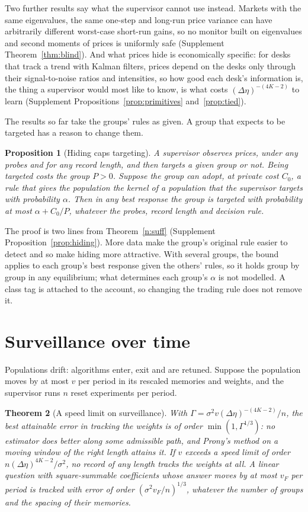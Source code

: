 \documentclass[12pt]{article}
\newtheorem{theorem}{Theorem}[section]
\newtheorem{proposition}[theorem]{Proposition}
\theoremstyle{definition}
\theoremstyle{remark}
\begin{document}
Two further results say what the supervisor cannot use instead. Markets with the same eigenvalues, the same one-step and long-run price variance can have arbitrarily different worst-case short-run gains, so no monitor built on eigenvalues and second moments of prices is uniformly safe (Supplement Theorem~\ref{thm:blind}). And what prices hide is economically specific: for desks that track a trend with Kalman filters, prices depend on the desks only through their signal-to-noise ratios and intensities, so how good each desk's information is, the thing a supervisor would most like to know, is what costs $(\Delta\eta)^{-(4K-2)}$ to learn (Supplement Propositions~\ref{prop:primitives} and~\ref{prop:tied}).

The results so far take the groups' rules as given. A group that expects to be targeted has a reason to change them.

\begin{proposition}[Hiding caps targeting]\label{n:hiding}
A supervisor observes prices, under any probes and for any record length, and then targets a given group or not. Being targeted costs the group $P>0$. Suppose the group can adopt, at private cost $C_0$, a rule that gives the population the kernel of a population that the supervisor targets with probability $\alpha$. Then in any best response the group is targeted with probability at most $\alpha+C_0/P$, whatever the probes, record length and decision rule.
\end{proposition}

The proof is two lines from Theorem~\ref{n:suff} (Supplement Proposition~\ref{prop:hiding}). More data make the group's original rule easier to detect and so make hiding more attractive. With several groups, the bound applies to each group's best response given the others' rules, so it holds group by group in any equilibrium; what determines each group's $\alpha$ is not modelled. A class tag is attached to the account, so changing the trading rule does not remove it.

\section{Surveillance over time}\label{n:dyn}

Populations drift: algorithms enter, exit and are retuned. Suppose the population moves by at most $v$ per period in its rescaled memories and weights, and the supervisor runs $n$ reset experiments per period.

\begin{theorem}[A speed limit on surveillance]\label{n:track}
With $\Gamma=\sigma^2v(\Delta\eta)^{-(4K-2)}/n$, the best attainable error in tracking the weights is of order $\min(1,\Gamma^{1/3})$: no estimator does better along some admissible path, and Prony's method on a moving window of the right length attains it. If $v$ exceeds a speed limit of order $n(\Delta\eta)^{4K-2}/\sigma^2$, no record of any length tracks the weights at all. A linear question with square-summable coefficients whose answer moves by at most $v_F$ per period is tracked with error of order $(\sigma^2v_F/n)^{1/3}$, whatever the number of groups and the spacing of their memories.
\end{theorem}
\end{document}
